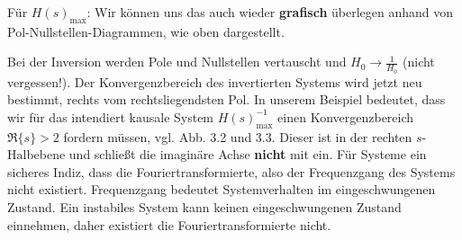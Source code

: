
\begin{ExCalc}
Für $H(s)_\mathrm{max}$: Wir können uns das auch wieder \textbf{grafisch}
überlegen anhand von Pol-Nullstellen-Diagrammen, wie oben dargestellt.

Bei der Inversion werden Pole und Nullstellen vertauscht und $H_0\rightarrow \frac{1}{H_0}$
(nicht vergessen!).
Der Konvergenzbereich des invertierten Systems wird jetzt neu bestimmt, rechts
vom rechtsliegendsten Pol.
In unserem Beispiel bedeutet, dass wir für das intendiert kausale
System $H(s)_\mathrm{max}^{-1}$ einen Konvergenzbereich $\Re\{s\}>2$ fordern
müssen, vgl. Abb. 3.2 und 3.3. Dieser ist in der rechten $s$-Halbebene und schließt die imaginäre Achse
\textbf{nicht} mit ein. Für Systeme ein sicheres Indiz, dass die
Fouriertransformierte, also der Frequenzgang des Systems nicht existiert.
Frequenzgang bedeutet Systemverhalten im eingeschwungenen Zustand. Ein instabiles
System kann keinen eingeschwungenen Zustand einnehmen, daher existiert die
Fouriertransformierte nicht.


\end{ExCalc}



